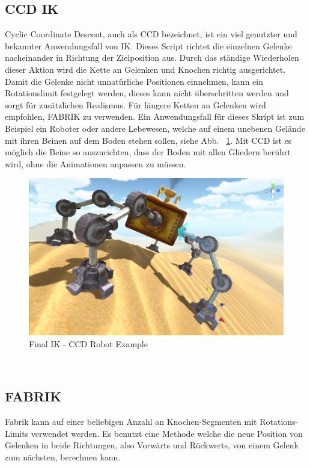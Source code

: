 \subsection{CCD IK}\label{subsec:ccd-ik}
Cyclic Coordinate Descent, auch als CCD bezeichnet, ist ein viel genutzter und bekannter Anwendungsfall von IK.
Dieses Script richtet die einzelnen Gelenke nacheinander in Richtung der Zielposition aus.
Durch das ständige Wiederholen dieser Aktion wird die Kette an Gelenken und Knochen richtig ausgerichtet.
Damit die Gelenke nicht unnatürliche Positionen einnehmen, kann ein Rotationslimit festgelegt werden, dieses kann nicht überschritten werden und sorgt für zusätzlichen Realismus.
Für längere Ketten an Gelenken wird empfohlen, FABRIK zu verwenden.
Ein Anwendungsfall für dieses Skript ist zum Beispiel ein Roboter oder andere Lebewesen, welche auf einem unebenen Gelände mit ihren Beinen auf dem Boden stehen sollen, siehe Abb. ~\ref{fig:finalIK_ccd_robot_example}.
Mit CCD ist es möglich die Beine so auszurichten, dass der Boden mit allen Gliedern berührt wird, ohne die Animationen anpassen zu müssen.
\begin {figure}
    \centering
    \includegraphics[scale=0.4]{pics/finalik_ccd}
    \caption{Final IK - CCD Robot Example}
    \label{fig:finalIK_ccd_robot_example}
\end {figure}
~\cite{FinalIK_CCD_2021}

\subsection{FABRIK}\label{subsec:fabrik}
Fabrik kann auf einer beliebigen Anzahl an Knochen-Segmenten mit Rotations-Limits verwendet werden.
Es benutzt eine Methode welche die neue Position von Gelenken in beide Richtungen, also Vorwärts und Rückwerts,
von einem Gelenk zum nächsten, berechnen kann.

